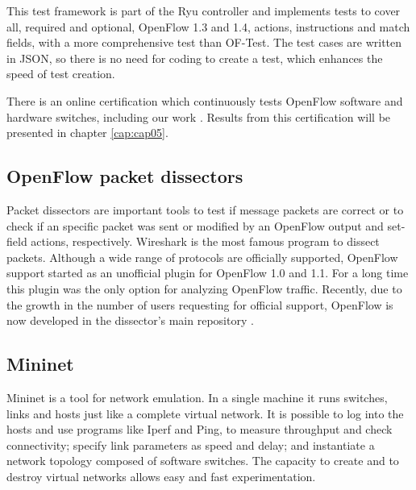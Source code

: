     This test framework is part of the Ryu controller and implements tests to cover all, required and optional, OpenFlow 1.3 and 1.4, actions, instructions and match fields, with a more comprehensive test than OF-Test. The test cases are written in JSON, so there is no need for coding to create a test, which enhances the speed of test creation. 
    
    There is an online certification which continuously tests OpenFlow software and hardware switches, including our work \cite{ryucert}. Results from this certification will be presented in chapter \ref{cap:cap05}.

    \subsection{OpenFlow packet dissectors}

    Packet dissectors are important tools to test if message packets are correct or to check if an specific packet was sent or modified by an OpenFlow output and set-field actions, respectively. Wireshark \cite{wireof} is the most famous program to dissect packets. Although a wide range of protocols are officially supported, OpenFlow support started as an  unofficial  plugin for OpenFlow 1.0 and 1.1. For a long time this plugin was the only option for analyzing OpenFlow traffic. Recently, due to the growth in the number of users requesting for official support, OpenFlow is now developed in the dissector's main repository \cite{wireof}.    
    \subsection{Mininet}
    
   Mininet \cite{Lantz:2010:NLR:1868447.1868466} is a tool for network emulation. In a single machine it runs switches, links and hosts just like a complete virtual network. It is possible to log into the hosts and use programs like Iperf \cite{iperf} and Ping, to measure throughput and check connectivity; specify link parameters as speed and delay; and instantiate a network topology composed of software switches. The capacity to create and to destroy virtual networks allows easy and fast experimentation. 
  
    